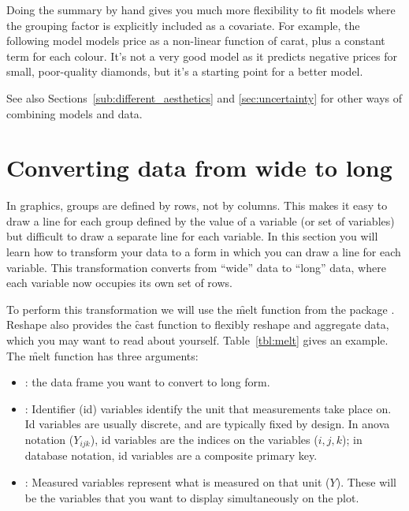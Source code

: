 Doing the summary by hand gives you much more flexibility to fit models where the grouping factor is explicitly included as a covariate. For example, the following model models price as a non-linear function of carat, plus a constant term for each colour. It's not a very good model as it predicts negative prices for small, poor-quality diamonds, but it's a starting point for a better model.

% 


See also Sections~\ref{sub:different_aesthetics} and \ref{sec:uncertainty} for other ways of combining models and data.

\section{Converting data from wide to long}
\label{sec:melting}

In \ggplot graphics, groups are defined by rows, not by columns. This makes it easy to draw a line for each group defined by the value of a variable (or set of variables) but difficult to draw a separate line for each variable. In this section you will learn how to transform your data to a form in which you can draw a line for each variable. This transformation converts from ``wide'' data to ``long'' data, where each variable now occupies its own set of rows.  

To perform this transformation we will use the \f{melt} function from the  package \citep{wickham:2007b}. Reshape also provides the \f{cast} function to flexibly reshape and aggregate data, which you may want to read about yourself. Table~\ref{tbl:melt} gives an example. The \f{melt} function has three arguments:  

\begin{itemize}

  \item {}: the data frame you want to convert to long form.

  \item {}: Identifier (id) variables identify the unit that measurements take place on. Id variables are usually discrete, and are typically fixed by design. In {\sc anova} notation ($Y_{ijk}$), id variables are the indices on the variables ($i, j, k$); in database notation, id variables are a composite primary key.

  \item {}: Measured variables represent what is measured on that unit ($Y$). These will be the variables that you want to display simultaneously on the plot.

\end{itemize}

